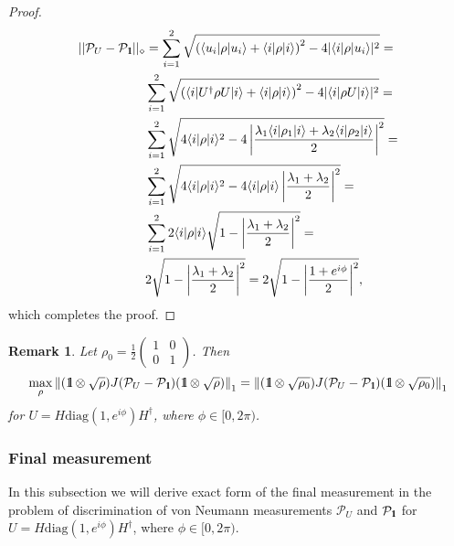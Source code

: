 \documentclass[preprint,12pt, a4paper]{elsarticle}
\newcommand{\ket}[1]{\ensuremath{|#1\rangle}}
\newcommand{\bra}[1]{\ensuremath{\langle#1|}}
\newcommand{\1}{{\rm 1\hspace{-0.9mm}l}}
\newcommand{\Id}{{\rm 1\hspace{-0.9mm}l}}
\newcommand{\PP}{\mathcal{P}}
\newcommand{\diag}{\mathrm{diag}}
\newtheorem{remark}{Remark}
\begin{document}
\begin{proof}
	\begin{equation}
	\begin{split}
	||\mathcal{P}_U - \mathcal{P}_{\1}||_\diamond &= \sum_{i=1}^2  
	\sqrt{\left(\bra{u_i}\rho\ket{u_i} + \bra{i} \rho \ket{i} \right)^2 - 
	4|\bra{i}\rho\ket{u_i}|^2} = \\& \sum_{i=1}^2  
	\sqrt{\left(\bra{i}U^\dagger\rho U \ket{i} + \bra{i} \rho \ket{i} \right)^2 
	- 4|\bra{i}\rho U \ket{i}|^2} = \\& \sum_{i=1}^2  \sqrt{4 \bra{i}\rho 
	\ket{i}^2 - 4 \left| \frac{\lambda_1 \bra{i}\rho_1 \ket{i} + 
	\lambda_2\bra{i} \rho_2\ket{i}}{2}\right|^2} =\\&  \sum_{i=1}^2  \sqrt{4 
	\bra{i}\rho \ket{i}^2 - 4 \bra{i} \rho \ket{i} \left| \frac{\lambda_1 + 
	\lambda_2}{2}\right|^2} = \\&  \sum_{i=1}^2 2 \bra{i} \rho \ket{i} \sqrt{1 
	-\left| \frac{\lambda_1 + \lambda_2}{2}\right|^2 } = \\& 2 \sqrt{1 -\left| 
	\frac{\lambda_1 + \lambda_2}{2}\right|^2 } = 
	2 \sqrt{1 -\left| \frac{1+e^{i \phi}}{2}\right|^2 } ,
	\end{split}
	\end{equation}
which completes the proof.
\end{proof}


\begin{remark}\label{lemma:rho}
	Let $\rho_{0} = \frac{1}{2} 
	\left(\begin{array}{cc}1&0\\0&1\end{array}\right)$. Then 
	\begin{equation}
	 \max_\rho \left\|(\1\otimes \sqrt{\rho}) J(\PP_U - \PP_{\Id}) 
	(\1\otimes 
	\sqrt{\rho})\right\|_1 =    \left\|(\1\otimes \sqrt{\rho_0}) J(\PP_U - 
	\PP_{\Id}) 
		(\1\otimes 
		\sqrt{\rho_0})\right\|_1
	\end{equation}
	for  $U = H\diag(1, e^{i \phi}) H^\dagger $, 
		where $\phi \in [0, 2\pi)$. 
\end{remark}


\subsubsection{Final measurement}\label{sec_example_final_measurement}
In this subsection we will derive exact form of the final measurement in the
problem of discrimination of von Neumann measurements $\PP_U$ and $\PP_{\Id}$
for $U = H \diag(1, e^{i \phi}) H^\dagger$, where $\phi \in [0, 2\pi)$.
\end{document}
